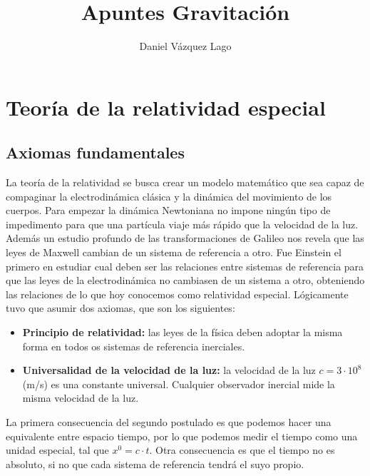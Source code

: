 \documentclass[12pt,a4paper]{book}
\title{Apuntes Gravitación}
\author{Daniel Vázquez Lago}
\numberwithin{equation}{section}
\numberwithin{figure}{section}
\begin{document}
\maketitle

\newpage

\tableofcontents

\newpage


\chapter{Teoría de la relatividad especial}

\section{Axiomas fundamentales}

La teoría de la relatividad se busca crear un modelo matemático que sea capaz de compaginar la electrodinámica clásica y la dinámica del movimiento de los cuerpos. Para empezar la dinámica Newtoniana no impone ningún tipo de impedimento para que una partícula viaje más rápido que la velocidad de la luz. Además un estudio profundo de las transformaciones de Galileo nos revela que las leyes de Maxwell cambian de un sistema de referencia a otro. Fue Einstein el primero en estudiar cual deben ser las relaciones entre sistemas de referencia para que las leyes de la electrodinámica no cambiasen de un sistema a otro, obteniendo las relaciones de lo que hoy conocemos como relatividad especial. Lógicamente tuvo que asumir dos axiomas, que son los siguientes:

\begin{itemize}
\item \textbf{Principio de relatividad:} las leyes de la física deben adoptar la misma forma en todos os sistemas de referencia inerciales.

\item \textbf{Universalidad de la velocidad de la luz:} la velocidad de la luz $c=3\cdot 10^8$ (m/s) es una constante universal. Cualquier observador inercial mide la misma velocidad de la luz.
\end{itemize}


La primera consecuencia del segundo postulado es que podemos hacer una equivalente entre espacio tiempo, por lo que podemos medir el tiempo como una unidad especial, tal que $x^0=c \cdot t$. Otra consecuencia es que el tiempo no es absoluto, si no que cada sistema de referencia tendrá el suyo propio.
\end{document}
